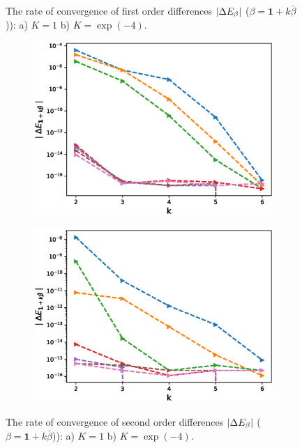 \documentclass[11pt]{article}
\begin{document}
\begin{figure}[h!]
	\caption{The rate of convergence of  first order differences $\left\lvert\Delta E_{\beta}\right\rvert$ ($\beta=\mathbf{1}+k \bar{\beta}$)): a) $K=1$ b)  $K=\operatorname{exp}(-4).$}
	\label{fig:test2}
\end{figure}

\begin{figure}[h!]
	\centering
	\begin{subfigure}{.5\textwidth}
		\centering
		\includegraphics[width=1\linewidth]{./figures/mixed_diff_second_way/H_043/N_8/mixed_difference_order2_rbergomi_8steps_H_043_K_1.eps}
		\caption{}
		\label{fig:sub3}
	\end{subfigure}%
	\begin{subfigure}{.5\textwidth}
		\centering
		\includegraphics[width=1\linewidth]{./figures/mixed_diff_second_way/H_043/N_8/mixed_difference_order2_rbergomi_8steps_H_043_K_exp__4.eps}
		\caption{}
		\label{fig:sub4}
	\end{subfigure}
	
	\caption{The rate of convergence of  second order differences $\left\lvert\Delta E_{\beta}\right\rvert$ ($\beta=\mathbf{1}+k \bar{\beta}$)): a) $K=1$ b)  $K=\operatorname{exp}(-4).$}
	\label{fig:test2}
\end{figure}
\end{document}
